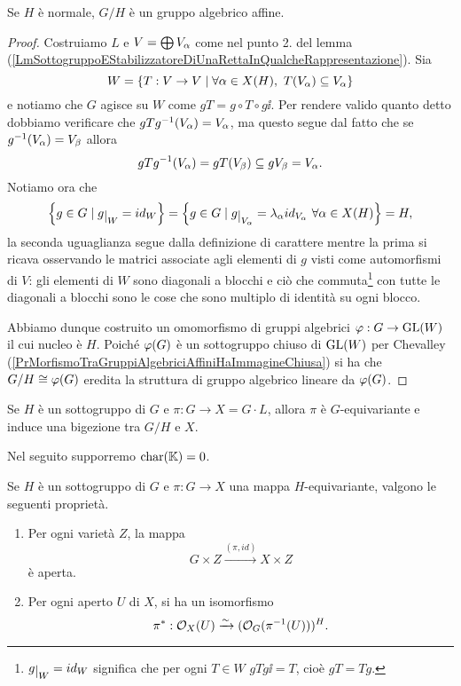 \begin{proposition}
Se $H$ \`e normale, $G/H$ \`e un gruppo algebrico affine.
\end{proposition}
\begin{proof}
Costruiamo $L$ e $V=\bigoplus V_\alpha$ come nel punto 2. del lemma (\ref{LmSottogruppoEStabilizzatoreDiUnaRettaInQualcheRappresentazione}). Sia
\[W=\left\{{T:V\to V\mid \forall \alpha\in X(H),\ T(V_\alpha)\subseteq V_\alpha}\right\}\]
e notiamo che $G$ agisce su $W$ come $gT=g\circ T\circ g\ii$. Per rendere valido quanto detto dobbiamo verificare che $g T g^{-1}(V_\alpha)=V_\alpha$, ma questo segue dal fatto che se $g^{-1}(V_\alpha)=V_\beta$ allora
\[g T g^{-1}(V_\alpha)=gT(V_\beta)\subseteq gV_\beta=V_\alpha.\]
Notiamo ora che
\[\cpa{g\in G\mid g\res W=id_W}=\cpa{g\in G\mid g\res{V_\al}=\la_\al id_{V_\al}\ \forall \al\in X(H)}=H,\]
la seconda uguaglianza segue dalla definizione di carattere mentre la prima si ricava osservando le matrici associate agli elementi di $g$ visti come automorfismi di $V$: gli elementi di $W$ sono diagonali a blocchi e ci\`o che commuta\footnote{$g\res W=id_W$ significa che per ogni $T\in W$ $gTg\ii=T$, cio\`e $gT=Tg$.} con tutte le diagonali a blocchi sono le cose che sono multiplo di identit\`a su ogni blocco.

Abbiamo dunque costruito un omomorfismo di gruppi algebrici $\varphi:G\to \mathrm{GL}(W)$ il cui nucleo \`e $H$. Poich\'e $\varphi(G)$ \`e un sottogruppo chiuso di $\mathrm{GL}(W)$ per Chevalley (\ref{PrMorfismoTraGruppiAlgebriciAffiniHaImmagineChiusa}) si ha che $G/H\cong \varphi(G)$ eredita la struttura di gruppo algebrico lineare da $\varphi(G)$.
\end{proof}

















\begin{remark}
    Se $H$ è un sottogruppo di $G$ e $\pi\colon G \to X=G\cdot L$, allora $\pi$ è $G$-equivariante e induce una bigezione tra $G/H$ e $X$.
\end{remark}


Nel seguito supporremo $\operatorname{char}(\mathbb{K})=0$.

\begin{proposition} Se $H$ è un sottogruppo di $G$ e $\pi\colon G \to X$ una mappa $H$-equivariante, valgono le seguenti proprietà.
    \begin{enumerate}
        \item Per ogni varietà $Z$, la mappa \[G\times Z \xrightarrow{(\pi,id)}X\times Z\] è aperta.
        \item Per ogni aperto $U$ di $X$, si ha un isomorfismo \[\pi^\ast:\mathcal{O}_X(U)\xrightarrow{\sim}(\mathcal{O}_G(\pi^{-1}(U)))^H.\]
    \end{enumerate}
\end{proposition}

